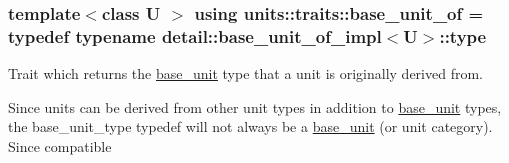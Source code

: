 \subsubsection[{base\+\_\+unit\+\_\+of}]{\setlength{\rightskip}{0pt plus 5cm}template$<$class U $>$ using {\bf units\+::traits\+::base\+\_\+unit\+\_\+of} = typedef typename detail\+::base\+\_\+unit\+\_\+of\+\_\+impl$<$U$>$\+::type}\label{namespaceunits_1_1traits_a3246512e5e5c554d14d183c00dc28428}


Trait which returns the {\ttfamily \hyperlink{structunits_1_1base__unit}{base\+\_\+unit}} type that a unit is originally derived from. 

Since units can be derived from other {\ttfamily unit} types in addition to {\ttfamily \hyperlink{structunits_1_1base__unit}{base\+\_\+unit}} types, the {\ttfamily base\+\_\+unit\+\_\+type} typedef will not always be a {\ttfamily \hyperlink{structunits_1_1base__unit}{base\+\_\+unit}} (or unit category). Since compatible 